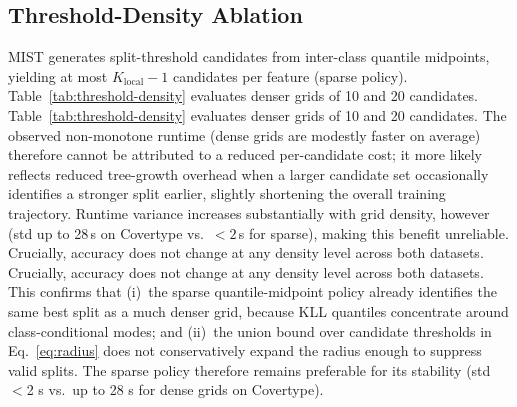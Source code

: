\documentclass{article}
\begin{document}
\subsection{Threshold-Density Ablation}
\label{app:threshold}
MIST generates split-threshold candidates from inter-class quantile midpoints,
yielding at most $K_{\mathrm{local}}-1$ candidates per feature (sparse policy).
Table~\ref{tab:threshold-density} evaluates denser grids of 10 and 20
candidates.
Table~\ref{tab:threshold-density} evaluates denser grids of 10 and 20
candidates. The observed non-monotone runtime (dense grids are modestly
faster on average) therefore cannot be attributed to a reduced per-candidate
cost; it more likely reflects reduced tree-growth overhead when a larger
candidate set occasionally identifies a stronger split earlier, slightly
shortening the overall training trajectory. Runtime variance increases
substantially with grid density, however (std up to 28\,s on Covertype
vs.\ ${<}2$\,s for sparse), making this benefit unreliable.
Crucially, accuracy does not change at any density level across both
datasets. Crucially, accuracy does not change at any density level across both
datasets. This confirms that (i)~the sparse quantile-midpoint policy already
identifies the same best split as a much denser grid, because KLL quantiles
concentrate around class-conditional modes; and (ii)~the union bound over
candidate thresholds in Eq.~\eqref{eq:radius} does not conservatively expand
the radius enough to suppress valid splits.
The sparse policy therefore remains preferable for its stability
(std $<$2 s vs.\ up to 28 s for dense grids on Covertype).
\begin{table}[h]
\caption{Threshold-density ablation (mean runtime; 5 seeds). Accuracy is unchanged at all densities.
Dense grids show lower mean runtime but substantially higher variance,
confirming the sparse policy as the stable, efficient default.}
\label{tab:threshold-density}
\centering
\small
{}
\end{table}
\end{document}
